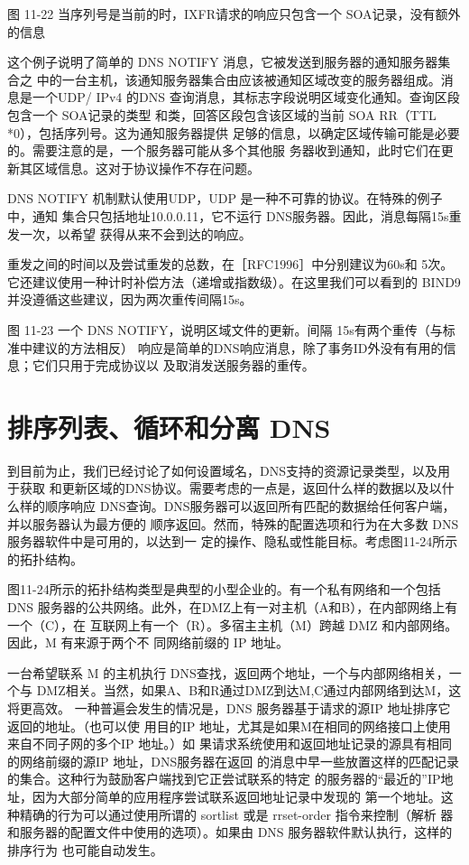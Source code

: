 图 11-22 当序列号是当前的时，IXFR请求的响应只包含一个 SOA记录，没有额外的信息


这个例子说明了简单的 DNS NOTIFY 消息，它被发送到服务器的通知服务器集合之
中的一台主机，该通知服务器集合由应该被通知区域改变的服务器组成。消息是一个UDP/
IPv4 的DNS 查询消息，其标志字段说明区域变化通知。查询区段包含一个 SOA记录的类型
和类，回答区段包含该区域的当前 SOA RR（TTL *0），包括序列号。这为通知服务器提供
足够的信息，以确定区域传输可能是必要的。需要注意的是，一个服务器可能从多个其他服
务器收到通知，此时它们在更新其区域信息。这对于协议操作不存在问题。

DNS NOTIFY 机制默认使用UDP，UDP 是一种不可靠的协议。在特殊的例子中，通知
集合只包括地址10.0.0.11，它不运行 DNS服务器。因此，消息每隔15s重发一次，以希望
获得从来不会到达的响应。

\begin{tcolorbox}
    重发之间的时间以及尝试重发的总数，在［RFC1996］中分别建议为60s和
    5次。它还建议使用一种计时补偿方法（递增或指数级）。在这里我们可以看到的
    BIND9 并没遵循这些建议，因为两次重传间隔15s。
\end{tcolorbox}

图 11-23
一个 DNS NOTIFY，说明区域文件的更新。间隔 15s有两个重传（与标准中建议的方法相反）
响应是简单的DNS响应消息，除了事务ID外没有有用的信息；它们只用于完成协议以
及取消发送服务器的重传。

\section{排序列表、循环和分离 DNS}

到目前为止，我们已经讨论了如何设置域名，DNS支持的资源记录类型，以及用于获取
和更新区域的DNS协议。需要考虑的一点是，返回什么样的数据以及以什么样的顺序响应
DNS查询。DNS服务器可以返回所有匹配的数据给任何客户端，并以服务器认为最方便的
顺序返回。然而，特殊的配置选项和行为在大多数 DNS服务器软件中是可用的，以达到一
定的操作、隐私或性能目标。考虑图11-24所示的拓扑结构。

图11-24所示的拓扑结构类型是典型的小型企业的。有一个私有网络和一个包括 DNS
服务器的公共网络。此外，在DMZ上有一对主机（A和B），在内部网络上有一个（C），在
互联网上有一个（R）。多宿主主机（M）跨越 DMZ 和内部网络。因此，M 有来源于两个不
同网络前缀的 IP 地址。

一台希望联系 M 的主机执行 DNS查找，返回两个地址，一个与内部网络相关，一个与
DMZ相关。当然，如果A、B和R通过DMZ到达M,C通过内部网络到达M，这将更高效。
一种普遍会发生的情况是，DNS 服务器基于请求的源IP 地址排序它返回的地址。（也可以使
用目的IP 地址，尤其是如果M在相同的网络接口上使用来自不同子网的多个IP 地址。）如
果请求系统使用和返回地址记录的源具有相同的网络前缀的源IP 地址，DNS服务器在返回
的消息中早一些放置这样的匹配记录的集合。这种行为鼓励客户端找到它正尝试联系的特定
的服务器的“最近的”IP地址，因为大部分简单的应用程序尝试联系返回地址记录中发现的
第一个地址。这种精确的行为可以通过使用所谓的 sortlist 或是 rrset-order 指令来控制（解析
器和服务器的配置文件中使用的选项）。如果由 DNS 服务器软件默认执行，这样的排序行为
也可能自动发生。

